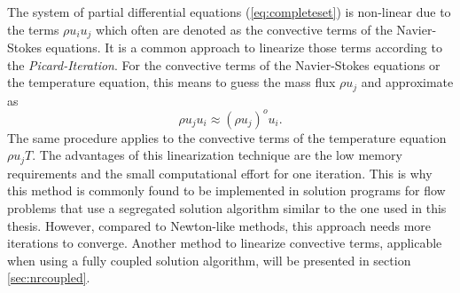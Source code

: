 The system of partial differential equations (\ref{eq:completeset}) is non-linear due to the terms \(\rho u_i u_j\) which often are denoted as the convective terms of the Navier-Stokes equations. It is a common approach to linearize those terms according to the \emph{Picard-Iteration}. For the convective terms of the Navier-Stokes equations or the temperature equation, this means to guess the mass flux \( \rho u_j\) and approximate as
\begin{displaymath}
  \rho u_j u_i \approx \left( \rho u_j \right)^o u_i.
\end{displaymath}
The same procedure applies to the convective terms of the temperature equation \(\rho u_j T\). The advantages of this linearization technique are the low memory requirements and the small computational effort for one iteration. This is why this method is commonly found to be implemented in solution programs for flow problems that use a segregated solution algorithm similar to the one used in this thesis. However, compared to Newton-like methods, this approach needs more iterations to converge. Another method to linearize convective terms, applicable when using a fully coupled solution algorithm, will be presented in section \ref{sec:nrcoupled}.
